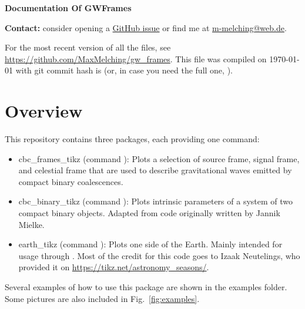 \documentclass[
    DIV=11,
    BCOR=0mm,
    paper=a4,
    fontsize=11pt,
    twoside=false,
    titlepage=true
]{scrartcl}
\newcommand{\code}[1]{{\color{codecolor}\ttfamily#1}}  %
\newcommand{\gitrevision}{%
  \StrLeft{\HEAD}{7}%
}
\begin{document}
{\noindent\rmfamily\Huge\bfseries
    Documentation Of \code{GWFrames}
}

\begin{center}
    \textbf{Contact:} consider opening a \href{https://github.com/MaxMelching/gw_frames/issues}{GitHub issue} or find me at \href{mailto:m-melching@web.de}{m-melching@web.de}.
\end{center}


For the most recent version of all the files, see \url{https://github.com/MaxMelching/gw_frames}. This file was compiled on \today{} with git commit hash
is \code{\gitrevision{}} (or, in case you need the full one, \code{\HEAD{}}\hspace{-0.5em}).



    \section{Overview}

This repository contains three packages, each providing one command:
\begin{itemize}
    \item \code{cbc\_frames\_tikz} (command \code{\string\drawframes}): Plots a
    selection of source frame, signal frame, and celestial frame that are
    used to describe gravitational waves emitted by compact binary coalescences.


    \item \code{cbc\_binary\_tikz} (command \code{\string\drawbinary}): Plots
    intrinsic parameters of a system of two compact binary objects. Adapted
    from code originally written by Jannik Mielke.


    \item \code{earth\_tikz} (command \code{\string\drawearth}): Plots one side of
    the Earth. Mainly intended for usage through \code{\string\drawframes}. Most of
    the credit for this code goes to Izaak Neutelings, who provided it on
    \url{https://tikz.net/astronomy_seasons/}.
\end{itemize}

Several examples of how to use this package are shown in the examples folder.
Some pictures are also included in Fig.~\ref{fig:examples}.
\end{document}
